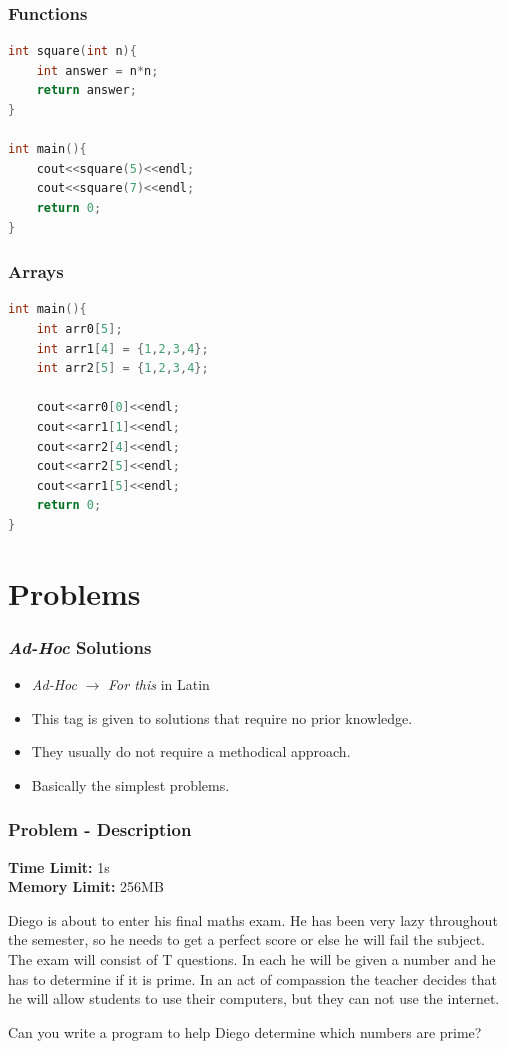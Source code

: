 \documentclass{beamer}
\begin{document}
\begin{frame}[fragile]
    \frametitle{Functions}

    \begin{lstlisting}[language=C++]
int square(int n){
    int answer = n*n;
    return answer;
}

int main(){
    cout<<square(5)<<endl;
    cout<<square(7)<<endl;
    return 0;
}
    \end{lstlisting}
\end{frame}

\begin{frame}[fragile]
    \frametitle{Arrays}

    \begin{lstlisting}[language=C++]
int main(){ 
    int arr0[5];
    int arr1[4] = {1,2,3,4};
    int arr2[5] = {1,2,3,4};
 
    cout<<arr0[0]<<endl;
    cout<<arr1[1]<<endl;
    cout<<arr2[4]<<endl;
    cout<<arr2[5]<<endl;
    cout<<arr1[5]<<endl;
    return 0;  
}
    \end{lstlisting}
\end{frame}

\section{Problems}

\begin{frame}
    \frametitle{\textit{Ad-Hoc} Solutions}

    \begin{itemize}
        \item \textit{Ad-Hoc} $\rightarrow$ \textit{For this} in Latin
        \item This tag is given to solutions that require no prior knowledge.
        \item They usually do not require a methodical approach.
        \item Basically the simplest problems.
    \end{itemize}
\end{frame}

\begin{frame}
    \frametitle{Problem - Description}

    \textbf{Time Limit:} 1s \\
    \textbf{Memory Limit:} 256MB

    Diego is about to enter his final maths exam. He has been very lazy throughout the semester, so he needs to get a perfect score or else he will fail the subject. The exam will consist of T questions. In each he will be given a number and he has to determine if it is prime. In an act of compassion the teacher decides that he will allow students to use their computers, but they can not use the internet. 

    Can you write a program to help Diego determine which numbers are prime?

\end{frame}
\end{document}
